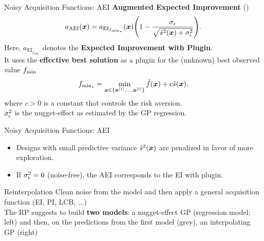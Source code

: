 \documentclass[11pt,compress,t,notes=noshow, xcolor=table]{beamer}
\begin{document}
\begin{framev}{Noisy Acquisition Functions: AEI}
\textbf{Augmented Expected Improvement} ()
$$
a_{\text{AEI}}(\bm{x}) = a_{\text{EI}_{f_{\min_*}}}(\bm{x}) \Bigg(1- \frac{\sigma_{\epsilon}}{\sqrt{\hat{s}^2(\bm{x})+ \sigma_{\epsilon}^2}}\Bigg).
$$
Here, $a_{\text{EI}_{f_{\min_*}}}$ denotes the \textbf{Expected Improvement with Plugin}.\\
It uses the \textbf{effective best solution} as a plugin for the (unknown) best observed value $f_{\min}$
$$
f_{\min_*} = \min_{\bm{x} \in \{\bm{x}^{[1]}, \ldots, \bm{x}^{[t]}\}} \hat{f}(\bm{x}) + c \hat{s}(\bm{x}),
$$
where $c > 0$ is a constant that controls the risk aversion.\\
\spacer
$\sigma_{\epsilon}^2$ is the nugget-effect as estimated by the GP regression.
\end{framev}


\begin{framev}{Noisy Acquisition Functions: AEI}
\vfill
\begin{itemize}
\item Designs with small predictive variance $\hat{s}^2(\bm{x})$ are penalized in favor of more exploration.
\item If $\sigma_\epsilon^2 = 0$ (noise-free), the AEI corresponds to the EI with plugin.
\end{itemize}
\end{framev}


\begin{framev}{Reinterpolation}
Clean noise from the model and then apply a general acquisition function (EI, PI, LCB, ...)\\
\spacer
The RP suggests to build \textbf{two models}: a nugget-effect GP (regression model; left) and then, on the predictions from the first model (grey), an interpolating GP (right)
\vfill
{}
\end{framev}
\end{document}
